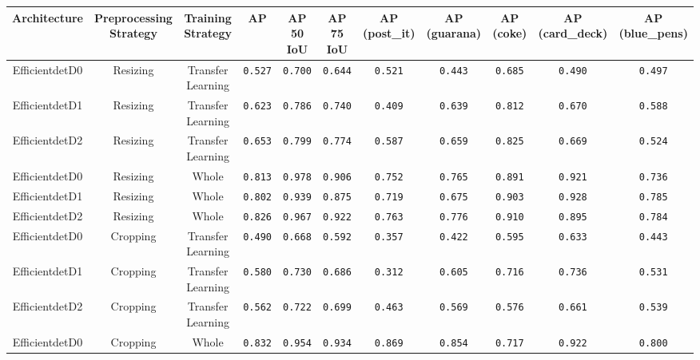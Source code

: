 \documentclass[openright]{normas-utf-tex} %
\begin{document}
\begin{table}[H]
	\centering
	\begin{adjustbox}{width=1\textwidth}
	\label{tab:modelPerformance}
	\begin{tabular}{c|c|c|c|c|c|c|c|c|c|c}
		\hline 
		Architecture & Preprocessing Strategy & Training Strategy & AP & AP 50 IoU & AP 75 IoU & AP (post\_it) & AP (guarana) & AP (coke) & AP (card\_deck) & AP (blue\_pens) \\
		\hline
        Efficientdet\-D0 & Resizing & Transfer Learning & \texttt{0.527} & \texttt{0.700} & \texttt{0.644} & \texttt{0.521} & \texttt{0.443} & \texttt{0.685} & \texttt{0.490} & \texttt{0.497} \\
		Efficientdet\-D1 & Resizing & Transfer Learning & \texttt{0.623} & \texttt{0.786} & \texttt{0.740} & \texttt{0.409} & \texttt{0.639} & \texttt{0.812} & \texttt{0.670} & \texttt{0.588} \\
		Efficientdet\-D2 & Resizing & Transfer Learning & \texttt{0.653} & \texttt{0.799} & \texttt{0.774} & \texttt{0.587} & \texttt{0.659} & \texttt{0.825} & \texttt{0.669} & \texttt{0.524} \\
		Efficientdet\-D0 & Resizing & Whole & \texttt{0.813} & \texttt{0.978} & \texttt{0.906} & \texttt{0.752} & \texttt{0.765} & \texttt{0.891} & \texttt{0.921} & \texttt{0.736} \\
		Efficientdet\-D1 & Resizing & Whole & \texttt{0.802} & \texttt{0.939} & \texttt{0.875} & \texttt{0.719} & \texttt{0.675} & \texttt{0.903} & \texttt{0.928} & \texttt{0.785} \\
		Efficientdet\-D2 & Resizing & Whole & \texttt{0.826} & \texttt{0.967} & \texttt{0.922} & \texttt{0.763} & \texttt{0.776} & \texttt{0.910} & \texttt{0.895} & \texttt{0.784} \\
		Efficientdet\-D0 & Cropping & Transfer Learning & \texttt{0.490} & \texttt{0.668} & \texttt{0.592} & \texttt{0.357} & \texttt{0.422} & \texttt{0.595} & \texttt{0.633} & \texttt{0.443} \\
		Efficientdet\-D1 & Cropping & Transfer Learning & \texttt{0.580} & \texttt{0.730} & \texttt{0.686} & \texttt{0.312} & \texttt{0.605} & \texttt{0.716} & \texttt{0.736} & \texttt{0.531} \\
		Efficientdet\-D2 & Cropping & Transfer Learning & \texttt{0.562} & \texttt{0.722} & \texttt{0.699} & \texttt{0.463} & \texttt{0.569} & \texttt{0.576} & \texttt{0.661} & \texttt{0.539} \\
		Efficientdet\-D0 & Cropping & Whole & \texttt{0.832} & \texttt{0.954} & \texttt{0.934} & \texttt{0.869} & \texttt{0.854} & \texttt{0.717} & \texttt{0.922} & \texttt{0.800} \\

\end{tabular}
\end{adjustbox}
\end{table}
\end{document}
